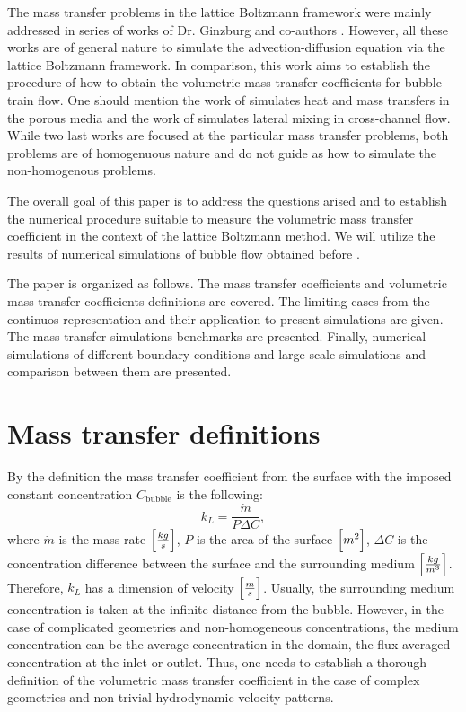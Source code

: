 \documentclass{article}
\newcommand{\beq}{\begin{equation}}
\newcommand{\feq}{\end{equation}}
\newcommand{\cbubble}{C_{\mathrm{bubble}}}
\begin{document}
The mass transfer problems in the lattice Boltzmann framework were mainly addressed in series of
works of Dr. Ginzburg and co-authors
\cite{ginzburg-main,ginzburg-boundary-conditions,ginzburg-saturated-flow}. However, all these works
are of general nature to simulate the advection-diffusion equation via the lattice Boltzmann
framework. In comparison, this work aims to establish the procedure of how to obtain the
volumetric mass transfer coefficients for bubble train flow. One should mention the work of
\citet{inamuro-scalar-boundary} simulates heat and mass transfers in the porous media and the work
of \citet{jos-mass} simulates lateral mixing in cross-channel flow. While two last works are focused
at the particular mass transfer problems, both problems are of homogenuous nature and do not
guide as how to simulate the non-homogenous problems.           

The overall goal of this paper is to address the questions arised and to establish the numerical
procedure suitable to measure the volumetric mass transfer coefficient in the context of the
lattice Boltzmann method. We will utilize the results of numerical simulations of bubble flow
obtained
before \cite{kuzmin-binary2d,kuzmin-binary3d}. 

The paper is organized as follows. The mass transfer coefficients and volumetric mass transfer
coefficients definitions are covered. The limiting cases from the continuos representation and their
application to present simulations are given. The mass transfer simulations benchmarks are
presented. Finally, numerical simulations of different boundary conditions and large scale
simulations and comparison between them are presented. 

\section{Mass transfer definitions}
By the definition the mass transfer coefficient from the surface with the imposed constant
concentration $\cbubble$ is the following:
\beq
\label{eq:main:definition}
k_L=\frac{\dot{m}}{P \Delta C},
\feq
where $\dot{m}$ is the mass rate $\Bigl[\frac{kg}{s}\Bigr]$, $P$ is the area of the surface
$\Bigl[m^2\Bigr]$, $\Delta C$ is the concentration difference between the surface and the surrounding medium
$\Bigl[\frac{kg}{m^3}\Bigr]$. Therefore, $k_L$ has a dimension of velocity
$\Bigl[\frac{m}{s}\Bigr]$. Usually, the surrounding medium concentration is taken at the infinite distance
from the bubble. However, in the case of complicated geometries and non-homogeneous concentrations, 
the medium concentration can be the average concentration in the domain, the flux averaged
concentration at the inlet or outlet. Thus, one needs to establish a thorough definition of the volumetric
mass transfer coefficient in the case of complex geometries and non-trivial hydrodynamic velocity patterns.
\end{document}
